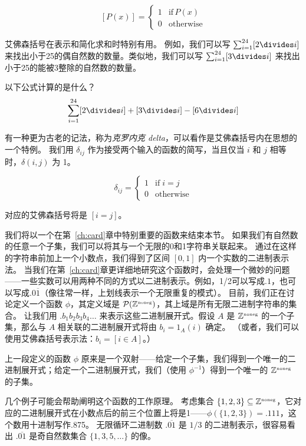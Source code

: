\[ [ P(x) ] = \left\{ \begin{array}{cl} 1 & \mbox{if} \, P(x) \\ 0 & \mbox{otherwise} \end{array} \right. \]

艾佛森括号在表示和简化求和时特别有用。
例如，我们可以写 $\sum_{i=1}^{24} [2 \divides i]$ 来找出小于25的偶自然数的数量。类似地，我们可以写 $\sum_{i=1}^{24} [3 \divides i]$ 来找出小于25的能被3整除的自然数的数量。

\begin{exer}
以下公式计算的是什么？
\[ \sum_{i=1}^{24} [2 \divides i] + [3 \divides i] - [6 \divides i] \]
\end{exer}

有一种更为古老的记法，称为\emph{克罗内克 delta}，可以看作是艾佛森括号内在思想的一个特例。
我们用 $\delta_{ij}$ 作为接受两个输入的函数的简写，当且仅当 $i$ 和 $j$ 相等时，$\delta(i,j)$ 为 1。

\[ \delta_{ij} =  \left\{ \begin{array}{cl} 1 & \mbox{if} \; i=j \\ 0 & \mbox{otherwise} \end{array} \right. \]

对应的艾佛森括号将是 $[i=j]$。

我们将以一个在第~\ref{ch:card}章中特别重要的函数来结束本节。
如果我们有自然数的任意一个子集，我们可以将其与一个无限的0和1字符串关联起来。
通过在这样的字符串前加上一个小数点，我们得到了区间 $[0,1]$ 内一个实数的二进制表示法。
当我们在第~\ref{ch:card}章更详细地研究这个函数时，会处理一个微妙的问题——一些实数可以用两种不同的方式以二进制表示。例如，1/2可以写成$.1$，也可以写成$.0\overline{1}$（像往常一样，上划线表示一个无限重复的模式）。
目前，我们正在讨论定义一个函数 $\phi$，其定义域是 ${\mathcal P}({\mathbb Z}^{\mbox{\tiny noneg}})$，其上域是所有无限二进制字符串的集合。
让我们用 $.b_1b_2b_3b_4\ldots$ 来表示这些二进制展开式。假设 $A$ 是 ${\mathbb Z}^{\mbox{\tiny noneg}}$ 的一个子集，那么与 $A$ 相关联的二进制展开式将由 $b_i = 1_A(i)$ 确定。
（或者，我们可以使用艾佛森括号表示法：$b_i = [i \in A]$。）

上一段定义的函数 $\phi$ 原来是一个双射——给定一个子集，我们得到一个唯一的二进制展开式；给定一个二进制展开式，我们（使用 $\phi^{-1}$）得到一个唯一的 ${\mathbb Z}^{\mbox{\tiny noneg}}$ 的子集。

几个例子可能会帮助阐明这个函数的工作原理。
考虑集合 $\{1,2,3\} \subseteq {\mathbb Z}^{\mbox{\tiny noneg}}$，它对应的二进制展开式在小数点后的前三个位置上将是1——$\phi(\{1,2,3\}) = .111$，这个数用十进制写作.875。
无限循环二进制数 $.\overline{01}$ 是 $1/3$ 的二进制表示，很容易看出 $.\overline{01}$ 是奇自然数集合 $\{1,3,5,\ldots\}$ 的像。

